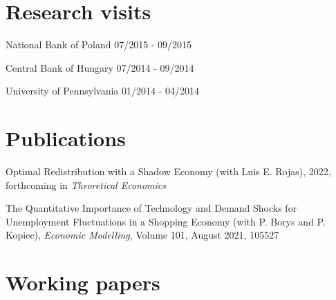 \documentclass[letterpaper]{article}
\renewenvironment{itemize}{
  \begin{list}{}{
    \setlength{\leftmargin}{1.5em}
  }
}{
  \end{list}
}
\begin{document}
\section*{Research visits}

\begin{itemize}
  \item National Bank of Poland \hfill  07/2015 - 09/2015
  \item Central Bank of Hungary \hfill  07/2014 - 09/2014
  \item University of Pennsylvania \hfill  01/2014 - 04/2014
\end{itemize}


  



\section*{Publications}

\begin{itemize}
\item Optimal Redistribution with a Shadow Economy (with Luis E. Rojas), 2022, forthcoming in \textit{Theoretical Economics}
\item The Quantitative Importance of Technology and Demand Shocks for Unemployment Fluctuations in a Shopping Economy (with P. Borys and P. Kopiec), \textit{Economic Modelling}, Volume 101, August 2021, 105527
\end{itemize}

\section*{Working papers}

\end{document}
